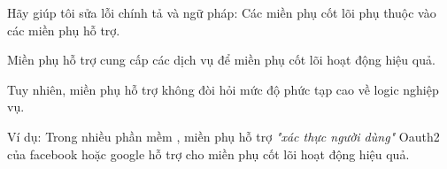 Hãy giúp tôi sửa lỗi chính tả và ngữ pháp:
Các miền phụ cốt lõi phụ thuộc vào các miền phụ hỗ trợ.

Miền phụ hỗ trợ cung cấp các dịch vụ để miền phụ cốt lõi hoạt động hiệu quả.

Tuy nhiên, miền phụ hỗ trợ không đòi hỏi mức độ phức tạp cao về logic nghiệp vụ.

Ví dụ: Trong  nhiều phần mềm , miền phụ hỗ trợ  \textit{"xác thực người dùng"}  Oauth2 của facebook hoặc google          hỗ trợ  cho miền phụ cốt lõi hoạt động hiệu quả.

